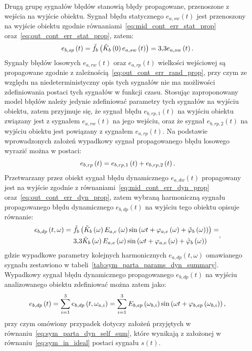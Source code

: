 Drugą grupę sygnałów błędów stanowią błędy propagowane, przenoszone z wejścia na wyjście obiektu. Sygnał błędu statycznego $e_{a,sw}(t)$ jest przenoszony na wyjście obiektu zgodnie równaniami~\eqref{eq:mid_cont_err_stat_prop} oraz~\eqref{eq:out_cont_err_stat_prop}, zatem:
\begin{equation}
e_{b,sp} \left(t\right) = \tilde{f}_{b} \left( \tilde{K}_{b} \left(0\right) e_{a,sw} \left(t\right) \right) = \num{3.3} e_{a,sw} \left(t\right) \label{eq:sym_partb_stat_prop_err}.
\end{equation}
Sygnały błędów losowych $e_{a,rw}(t)$ oraz $e_{a,rp}(t)$ wielkości wejściowej są propagowane zgodnie z zależnością~\eqref{eq:out_cont_err_rand_prop}, przy czym ze względu na niedeterministyczny opis tych sygnałów nie ma możliwości zdefiniowania postaci tych sygnałów w funkcji czasu. Stosując zaproponowany model błędów należy jedynie zdefiniować parametry tych sygnałów na wyjściu obiektu, zatem przyjmuje się, że sygnał błędu $e_{b,rp,1}(t)$ na wyjściu obiektu związany jest z sygnałem $e_{a,rw}(t)$ na jego wejściu, oraz że sygnał $e_{b,rp,2}(t)$ na wyjściu obiektu jest powiązany z sygnałem $e_{a,rp}(t)$. Na podstawie wprowadzonych założeń wypadkowy sygnał propagowanego błędu losowego wyrazić można w postaci:
\begin{equation}
e_{b,rp} \left(t\right) = e_{b,rp,1} \left(t\right) + e_{b,rp,2} \left(t\right) \label{eq:sym_partb_rand_prop_err}.
\end{equation}
Przetwarzany przez obiekt sygnał błędu dynamicznego $e_{a,dw}(t)$ propagowany jest na wyjście zgodnie z równaniami~\eqref{eq:mid_cont_err_dyn_prop} oraz~\eqref{eq:out_cont_err_dyn_prop}, zatem wybraną harmoniczną sygnału propagowanego błędu dynamicznego $e_{b,dp}(t)$ na wyjściu tego obiektu opisuje równanie:
\begin{equation}
\begin{split}
e_{b,dp} \left(t,\omega\right) =~
& \tilde{f}_{b} \left( \tilde{K}_{b} \left(\omega\right) E_{a,e} \left(\omega\right) \sin \left( \omega t + \varphi_{a,e} \left(\omega\right) + \tilde{\varphi}_{b} \left(\omega\right) \right) \right) = \\
& \num{3.3} \tilde{K}_{b} \left(\omega\right) E_{a,e} \left(\omega\right) \sin \left( \omega t + \varphi_{a,e} \left(\omega\right) + \tilde{\varphi}_{b} \left(\omega\right) \right)
\end{split}
\label{eq:sym_partb_dyn_prop_err},
\end{equation}
gdzie wypadkowe parametry kolejnych harmonicznych $e_{a,dp}(t,\omega)$ omawianego sygnału zestawiono w tabeli~\ref{tab:sym_parta_params_dyn_summary}. Wypadkowy sygnał błędu dynamicznego propagowanego $e_{b,dp}(t)$ na wyjściu analizowanego obiektu zdefiniować można zatem jako:
\begin{equation}
e_{b,dp} \left(t\right) = \sum _{i = 1} ^{3} e_{b,dp} \left(t,\omega_{a,i}\right) = \sum _{i = 1} ^{3} E_{b,ep} \left(\omega_{b,i}\right) \sin \left(\omega t + \varphi_{b,ep} \left(\omega_{b,i}\right)\right) \label{eq:sym_partb_dyn_prop_sum},
\end{equation}
przy czym omówiony przypadek dotyczy założeń przyjętych w równaniu~\eqref{eq:sym_parta_dyn_self_sum}, które wynikają z założonej w równaniu~\eqref{eq:sym_in_ideal} postaci sygnału $s(t)$.

